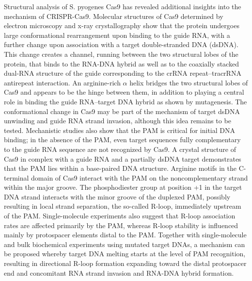 \documentclass[sn-standardnature]{sn-jnl}%
\theoremstyle{thmstyleone}%
\theoremstyle{thmstyletwo}%
\theoremstyle{thmstylethree}%
\begin{document}
Structural analysis of S. pyogenes Cas9 has revealed additional insights into the mechanism of CRISPR-Cas9. Molecular structures of Cas9 determined by electron microscopy and x-ray crystallography show that the protein undergoes large conformational rearrangement upon binding to the guide RNA, with a further change upon association with a target double-stranded DNA (dsDNA). This change creates a channel, running between the two structural lobes of the protein, that binds to the RNA-DNA hybrid as well as to the coaxially stacked dual-RNA structure of the guide corresponding to the crRNA repeat–tracrRNA antirepeat interaction. An arginine-rich $\alpha$ helix bridges the two structural lobes of Cas9 and appears to be the hinge between them, in addition to playing a central role in binding the guide RNA–target DNA hybrid as shown by mutagenesis. The conformational change in Cas9 may be part of the mechanism of target dsDNA unwinding and guide RNA strand invasion, although this idea remains to be tested. Mechanistic studies also show that the PAM is critical for initial DNA binding; in the absence of the PAM, even target sequences fully complementary to the guide RNA sequence are not recognized by Cas9. A crystal structure of Cas9 in complex with a guide RNA and a partially dsDNA target demonstrates that the PAM lies within a base-paired DNA structure. Arginine motifs in the C-terminal domain of Cas9 interact with the PAM on the noncomplementary strand within the major groove. The phosphodiester group at position +1 in the target DNA strand interacts with the minor groove of the duplexed PAM, possibly resulting in local strand separation, the so-called R-loop, immediately upstream of the PAM. Single-molecule experiments also suggest that R-loop association rates are affected primarily by the PAM, whereas R-loop stability is influenced mainly by protospacer elements distal to the PAM. Together with single-molecule and bulk biochemical experiments using mutated target DNAs, a mechanism can be proposed whereby target DNA melting starts at the level of PAM recognition, resulting in directional R-loop formation expanding toward the distal protospacer end and concomitant RNA strand invasion and RNA-DNA hybrid formation.




\end{document}
